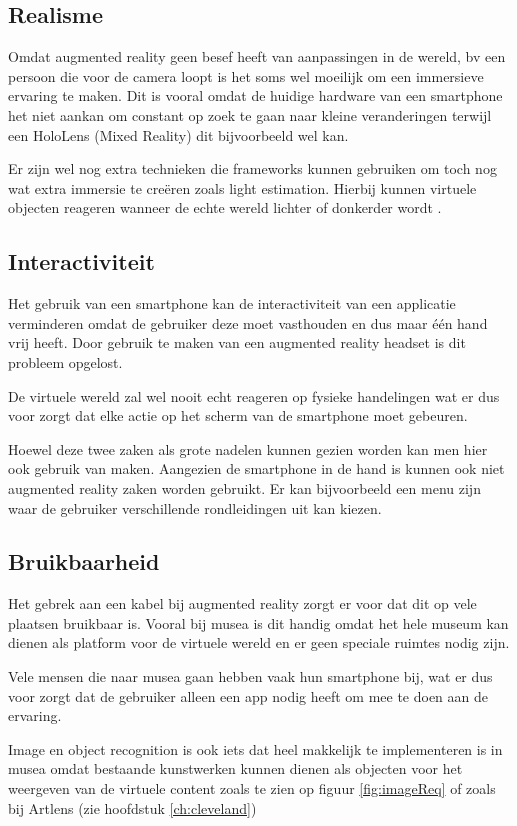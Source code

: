 \subsection{Realisme}
Omdat augmented reality geen besef heeft van aanpassingen in de wereld, bv een persoon die voor de camera loopt is het soms wel moeilijk om een immersieve ervaring te maken. Dit is vooral omdat de huidige hardware van een smartphone het niet aankan om constant op zoek te gaan naar kleine veranderingen terwijl een HoloLens (Mixed Reality) dit bijvoorbeeld wel kan.

Er zijn wel nog extra technieken die frameworks kunnen gebruiken om toch nog wat extra immersie te creëren zoals light estimation. Hierbij kunnen virtuele objecten reageren wanneer de echte wereld lichter of donkerder wordt \autocite{ARCoreConcepts}.

\subsection{Interactiviteit}
Het gebruik van een smartphone kan de interactiviteit van een applicatie verminderen omdat de gebruiker deze moet vasthouden en dus maar één hand vrij heeft. Door gebruik te maken van een augmented reality headset is dit probleem opgelost.

De virtuele wereld zal wel nooit echt reageren op fysieke handelingen wat er dus voor zorgt dat elke actie op het scherm van de smartphone moet gebeuren.

Hoewel deze twee zaken als grote nadelen kunnen gezien worden kan men hier ook gebruik van maken. Aangezien de smartphone in de hand is kunnen ook niet augmented reality zaken worden gebruikt. Er kan bijvoorbeeld een menu zijn waar de gebruiker verschillende rondleidingen uit kan kiezen.

\subsection{Bruikbaarheid}
Het gebrek aan een kabel bij augmented reality zorgt er voor dat dit op vele plaatsen bruikbaar is. Vooral bij musea is dit handig omdat het hele museum kan dienen als platform voor de virtuele wereld en er geen speciale ruimtes nodig zijn.

Vele mensen die naar musea gaan hebben vaak hun smartphone bij, wat er dus voor zorgt dat de gebruiker alleen een app nodig heeft om mee te doen aan de ervaring.

Image en object recognition is ook iets dat heel makkelijk te implementeren is in musea omdat bestaande kunstwerken kunnen dienen als objecten voor het weergeven van de virtuele content zoals te zien op figuur \ref{fig:imageReq} of zoals bij Artlens (zie hoofdstuk \ref{ch:cleveland})


